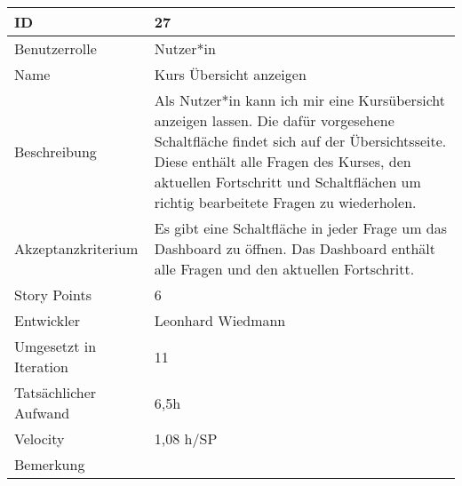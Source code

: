 \begin{tabularx}{\textwidth}{|p{}|X|}
	\hline
	ID & 27 \\
	\hline
	Benutzerrolle & Nutzer*in \\
	\hline
	Name & Kurs Übersicht anzeigen\\
	\hline
	Beschreibung & Als Nutzer*in kann ich mir eine Kursübersicht anzeigen lassen. Die dafür vorgesehene Schaltfläche findet sich auf der Übersichtsseite.
		Diese enthält alle Fragen des Kurses, den aktuellen Fortschritt und Schaltflächen um richtig bearbeitete Fragen zu wiederholen. \\
	\hline
	Akzeptanzkriterium & Es gibt eine Schaltfläche in jeder Frage um das Dashboard zu öffnen. Das Dashboard enthält alle Fragen und den aktuellen Fortschritt. \\
	\hline
	Story Points & 6 \\
	\hline
	Entwickler & Leonhard Wiedmann \\
	\hline
	Umgesetzt in Iteration & 11 \\
	\hline
	Tatsächlicher Aufwand & 6,5h\\
	\hline
	Velocity & 1,08 h/SP\\
	\hline
	Bemerkung & \\
	\hline
\end{tabularx}
\vspace{20pt}

